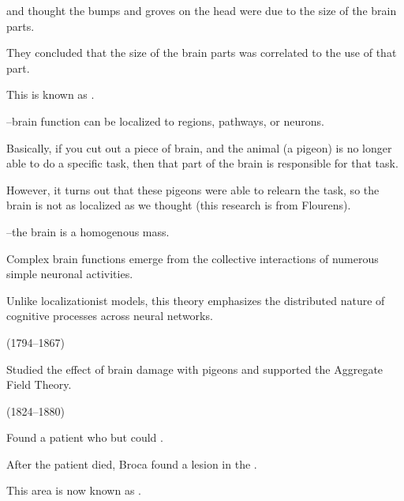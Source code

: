 \begin{coloredlist}
    \item {} and  thought the bumps and groves on the head were due to the size of the brain parts.
    \item They concluded that the size of the brain parts was correlated to the use of that part.
    \item This is known as .
    \item {}--brain function can be localized to regions, pathways, or neurons.
    \begin{coloredlist}
        \item Basically, if you cut out a piece of brain, and the animal (a pigeon) is no longer able to do a specific task, then that part of the brain is responsible for that task.
        \item However, it turns out that these pigeons were able to relearn the task, so the brain is not as localized as we thought (this research is from Flourens).
    \end{coloredlist}
    \item {}--the brain is a homogenous mass.
    \begin{coloredlist}
        \item Complex brain functions emerge from the collective interactions of numerous simple neuronal activities.
        \item Unlike localizationist models, this theory emphasizes the distributed nature of cognitive processes across neural networks.
    \end{coloredlist}
    \item {} (1794--1867)
    \begin{coloredlist}
        \item Studied the effect of brain damage with pigeons and supported the Aggregate Field Theory.
    \end{coloredlist}
    \item {} (1824--1880)
    \begin{coloredlist}
        \item Found a patient who  but could .
        \item After the patient died, Broca found a lesion in the .
        \item This area is now known as .

\end{coloredlist}
\end{coloredlist}
